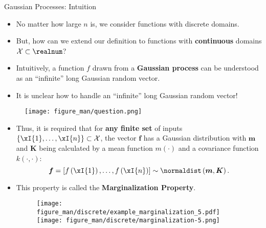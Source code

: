 \begin{frame}[c,allowframebreaks]{Gaussian Processes: Intuition}


\begin{itemize}
  \item  No matter how large $n$ is, we consider functions with discrete domains.
\vspace{.3cm}
  \item But, how can we extend our definition to functions with \textbf{continuous} domains $\Xspace \subset \realnum$?
\vspace{.3cm}
  \item Intuitively, a function $f$ drawn from a \textbf{Gaussian process} can be understood as an ``infinite'' long Gaussian random vector.
\vspace{.3cm}
  \item It is unclear how to handle an ``infinite'' long Gaussian random vector!
\end{itemize}

\vspace{.3cm}

\begin{figure}
\texttt{[image: figure\_man/question.png]}
\end{figure}
\framebreak

\begin{itemize}
\item Thus, it is required that for \textbf{any finite set} of inputs $\{\xI{1},\dots,\xI{n}\} \subset \Xspace$, the vector $\mathbf{f}$ has a Gaussian distribution with $\bm{m}$ and $\bm{K}$ being calculated by a mean function $m(\cdot)$ and a covariance function $k(\cdot,\cdot)$:\vspace{-.2cm}$$\bm{f} = \left[f\left(\xI{1}\right),\dots, f\left(\xI{n}\right)\right] \sim\normaldist\left(\bm{m},\bm{K}\right).$$
    
\item This property is called the \textbf{Marginalization Property}. 
\vspace{.15cm}
\begin{figure}
\texttt{[image: figure\_man/discrete/example\_marginalization\_5.pdf]}
\texttt{[image: figure\_man/discrete/marginalization-5.png]}
\end{figure}
\end{itemize}


\framebreak


\end{frame}

